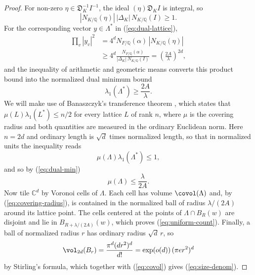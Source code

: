 \begin{proof}
For non-zero $\eta\in\mathfrak D_K^{-1}I^{-1}$, the ideal $(\eta)\mathfrak D_K I$ is integral, so
\[
   |N_{K/\mathbb{Q}}(\eta)|\,|\Delta_K|\,N_{K/\mathbb{Q}}(I)\geq1.
\]
For the corresponding vector $y\in\Lambda^*$ in (\ref{eq:dual-lattice}),
\[
\begin{aligned}
   \prod_v |y_v|^2
   &=4^dN_{F/\mathbb{Q}}(\alpha)\,|N_{K/\mathbb{Q}}(\eta)| \\
   &\geq 4^d\frac{N_{F/\mathbb{Q}}(\alpha)}{|\Delta_K|\,N_{K/\mathbb{Q}}(I)}
    =\left(\frac{2A}{\lambda}\right)^{2d},
\end{aligned}
\]
and the inequality of arithmetic and geometric means converts this product bound into the normalized dual minimum bound
\begin{equation}\label{eq:dual-min}
   \lambda_1(\Lambda^*)\geq \frac{2A}{\lambda}.
\end{equation}
We will make use of Banaszczyk's transference theorem \cite[Theorem 2.2]{Banaszczyk}, which states that $\mu(L)\lambda_1(L^*)\leq n/2$ for every lattice $L$ of rank $n$, where $\mu$ is the covering radius and both quantities are measured in the ordinary Euclidean norm.  Here $n=2d$ and ordinary length is $\sqrt d$ times normalized length, so that in normalized units the inequality reads
\[
   \mu(\Lambda)\lambda_1(\Lambda^*)\leq1,
\]
and so by (\ref{eq:dual-min})
\begin{equation}\label{eq:covering-radius}
   \mu(\Lambda)\leq \frac{\lambda}{2A}.
\end{equation}
Now tile $\mathbb{C}^d$ by Voronoi cells of $\Lambda$.  Each cell has volume $\covol(\Lambda)$ and, by (\ref{eq:covering-radius}), is contained in the normalized ball of radius $\lambda/(2A)$ around its lattice point.  The cells centered at the points of $\Lambda\cap B_R(w)$ are disjoint and lie in $B_{R+\lambda/(2A)}(w)$, which proves (\ref{eq:uniform-count}).  Finally, a ball of normalized radius $r$ has ordinary radius $\sqrt d\,r$, so
\[
   \vol_{2d}(B_r)=\frac{\pi^d(dr^2)^d}{d!}=\exp(o(d))\,(\pi e r^2)^d
\]
by Stirling's formula, which together with (\ref{eq:covol}) gives (\ref{eq:size-denom}).
\end{proof}

